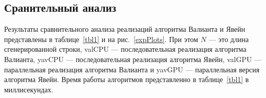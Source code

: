 \subsection{Сранительный анализ}

Результаты сравнительного анализа реализаций алгоритма Валианта и Явейн представлены в таблице~\ref{tbl1} и на рис.~\ref{expPlots}.
При этом $N$ –-- это длина сгенерированной строки, valCPU --- последовательная реализация алгоритма Валианта, yavCPU --- последовательная реализация алгоритма Явейн, valGPU --- параллельная реализация алгоритма Валианта и yavGPU --- параллельная версия алгоритма Явейн.
Время работы алгоритмов представленно в таблице~\ref{tbl1}  в миллисекундах.

\begin{table}[h]
\caption{Результаты сравнительного анализа (время в мс)}
\label{tbl1}
\centering
{}
\end{table}

